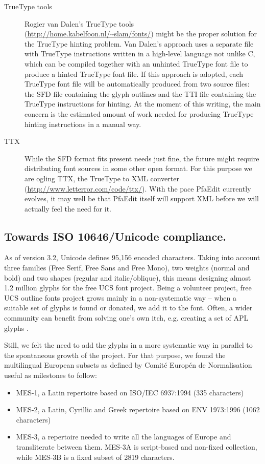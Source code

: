 \documentclass[english]{eurotex2003}
\begin{document}
\begin{description}
\item[TrueType tools] Rogier van Dalen's TrueType tools
(\url{http://home.kabelfoon.nl/~slam/fonts/}) might be the proper
solution for the TrueType hinting problem. Van Dalen's approach uses a
separate file with TrueType instructions written in a high-level
language not unlike C, which can be compiled together with an unhinted
TrueType font file to produce a hinted TrueType font file. If this
approach is adopted, each TrueType font file will be automatically
produced from two source files: the SFD file containing the glyph
outlines and the TTI file containing the TrueType instructions for
hinting. At the moment of this writing, the main concern is the
estimated amount of work needed for producing TrueType hinting
instructions in a manual way.

\item[TTX] While the SFD format fits present needs just fine, the
future might require distributing font sources in some other open
format. For this purpose we are ogling TTX, the TrueType to XML
converter (\url{http://www.letterror.com/code/ttx/}). With the pace
PfaEdit currently evolves, it may well be that PfaEdit itself will
support XML before we will actually feel the need for it.

\end{description}

\subsection{Towards ISO 10646/Unicode compliance.}

As of version 3.2, Unicode defines 95,156 encoded characters. Taking
into account three families (Free Serif, Free Sans and Free Mono), two
weights (normal and bold) and two shapes (regular and
italic/ob\-lique), this means designing almost 1.2 million glyphs for
the free UCS font project. Being a volunteer project, free UCS outline
fonts project grows mainly in a non-systematic way -- when a suitable
set of glyphs is found or donated, we add it to the font. Often, a
wider community can benefit from solving one's own itch, e.g. creating
a set of APL glyphs \cite{Chastney:1999,Chastney:2001}.

Still, we felt the need to add the glyphs in a more systematic way in
parallel to the spontaneous growth of the project. For that purpose,
we found the multilingual European subsets as defined by Co\-mi\-t\'e
Euro\-p\'en de Normalisation \cite{CWA13873} useful as milestones to
follow:
\begin{itemize}
\item MES-1, a Latin repertoire based on ISO/IEC 6937:1994 (335
characters)
\item MES-2, a Latin, Cyrillic and Greek repertoire based on ENV
1973:1996 (1062 characters)
\item MES-3, a repertoire needed to write all the languages of Europe
and transliterate between them. MES-3A is script-based and non-fixed
collection, while MES-3B is a fixed subset of 2819 characters.
\end{itemize}
\end{document}
